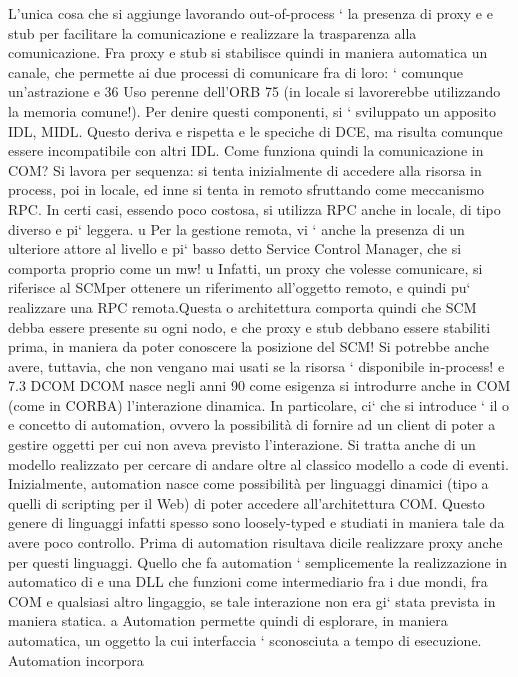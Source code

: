 \documentclass[a4paper,12pt]{article}
\begin{document}
L'unica cosa che si aggiunge lavorando out-of-process ` la presenza di proxy
e
e stub per facilitare la comunicazione e realizzare la trasparenza alla comunicazione. Fra proxy e stub si stabilisce
quindi in maniera automatica un canale,
che permette ai due processi di comunicare fra di loro: ` comunque un'astrazione
e
36 Uso
perenne dell'ORB
75
\newpage
(in locale si lavorerebbe utilizzando la memoria comune!). Per denire questi
componenti, si ` sviluppato un apposito IDL, MIDL. Questo deriva e rispetta
e
le speciche di DCE, ma risulta comunque essere incompatibile con altri IDL.
Come funziona quindi la comunicazione in COM? Si lavora per sequenza: si
tenta inizialmente di accedere alla risorsa in process, poi in locale, ed inne si
tenta in remoto sfruttando come meccanismo RPC. In certi casi, essendo poco
costosa, si utilizza RPC anche in locale, di tipo diverso e pi` leggera.
u
Per la gestione remota, vi ` anche la presenza di un ulteriore attore al livello
e
pi` basso detto Service Control Manager, che si comporta proprio come un mw!
u
Infatti, un proxy che volesse comunicare, si riferisce al SCMper ottenere un
riferimento all'oggetto remoto, e quindi pu` realizzare una RPC remota.Questa
o
architettura comporta quindi che SCM debba essere presente su ogni nodo, e
che proxy e stub debbano essere stabiliti prima, in maniera da poter conoscere
la posizione del SCM! Si potrebbe anche avere, tuttavia, che non vengano mai
usati se la risorsa ` disponibile in-process!
e
7.3
DCOM
DCOM nasce negli anni 90 come esigenza si introdurre anche in COM (come
in CORBA) l'interazione dinamica. In particolare, ci` che si introduce ` il
o
e
concetto di automation, ovvero la possibilità di fornire ad un client di poter
a
gestire oggetti per cui non aveva previsto l'interazione. Si tratta anche di un
modello realizzato per cercare di andare oltre al classico modello a code di eventi.
Inizialmente, automation nasce come possibilità per linguaggi dinamici (tipo
a
quelli di scripting per il Web) di poter accedere all'architettura COM. Questo
genere di linguaggi infatti spesso sono loosely-typed e studiati in maniera tale
da avere poco controllo. Prima di automation risultava dicile realizzare proxy
anche per questi linguaggi.
Quello che fa automation ` semplicemente la realizzazione in automatico di
e
una DLL che funzioni come intermediario fra i due mondi, fra COM e qualsiasi
altro lingaggio, se tale interazione non era gi` stata prevista in maniera statica.
a
Automation permette quindi di esplorare, in maniera automatica, un oggetto
la cui interfaccia ` sconosciuta a tempo di esecuzione. Automation incorpora
\end{document}
